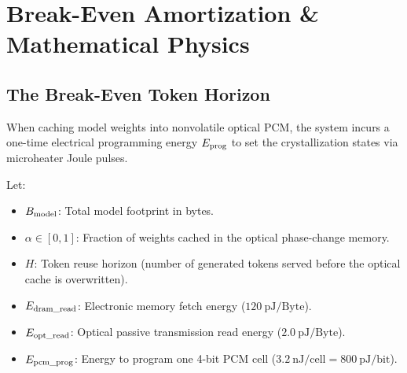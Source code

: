\documentclass[11pt,a4paper]{report}
\begin{document}
\chapter{Break-Even Amortization \& Mathematical Physics}

\section{The Break-Even Token Horizon}
When caching model weights into nonvolatile optical PCM, the system incurs a one-time electrical programming energy $E_{\rm prog}$ to set the crystallization states via microheater Joule pulses. 

Let:
\begin{itemize}
\item $B_{\rm model}$: Total model footprint in bytes.
\item $\alpha \in [0, 1]$: Fraction of weights cached in the optical phase-change memory.
\item $H$: Token reuse horizon (number of generated tokens served before the optical cache is overwritten).
\item $E_{\rm dram\_read}$: Electronic memory fetch energy ($120~\text{pJ/Byte}$).
\item $E_{\rm opt\_read}$: Optical passive transmission read energy ($2.0~\text{pJ/Byte}$).
\item $E_{\rm pcm\_prog}$: Energy to program one 4-bit PCM cell ($3.2~\text{nJ/cell} = 800~\text{pJ/bit}$).
\end{itemize}
\end{document}
